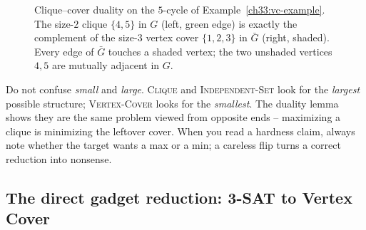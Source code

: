 \begin{figure}[h]
\centering
{}
\caption{Clique--cover duality on the $5$-cycle of Example~\ref{ch33:vc-example}.
The size-$2$ clique $\{4,5\}$ in $G$ (left, green edge) is exactly the complement
of the size-$3$ vertex cover $\{1, 2, 3\}$ in $\bar G$ (right, shaded). Every edge
of $\bar G$ touches a shaded vertex; the two unshaded vertices $4,5$ are mutually
adjacent in $G$.}
\label{ch33:vc-duality-fig}
\end{figure}

\begin{trapbox}
Do not confuse \emph{small} and \emph{large}. \textsc{Clique} and
\textsc{Independent-Set} look for the \emph{largest} possible structure;
\textsc{Vertex-Cover} looks for the \emph{smallest}. The duality lemma shows they
are the same problem viewed from opposite ends -- maximizing a clique is
minimizing the leftover cover. When you read a hardness claim, always note
whether the target wants a max or a min; a careless flip turns a correct
reduction into nonsense.
\end{trapbox}

\subsection{The direct gadget reduction: 3-SAT to Vertex Cover}
\label{ch33:sec-3sat-to-vc}

